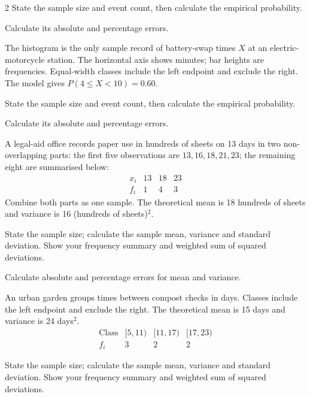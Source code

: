\begin{multicols}{2}
State the sample size and event count, then calculate the empirical probability. 

Calculate its absolute and percentage errors. 


The histogram is the only sample record of battery-swap times $X$ at an electric-motorcycle station. The horizontal axis shows minutes; bar heights are frequencies. Equal-width classes include the left endpoint and exclude the right.
The model gives $P(4\le X<10)=0.60$.

State the sample size and event count, then calculate the empirical probability. 

Calculate its absolute and percentage errors. 



A legal-aid office records paper use in hundreds of sheets on 13 days in two non-overlapping parts: the first five observations are $13,16,18,21,23$; the remaining eight are summarised below:
\[\begin{array}{c|rrr}x_i&13&18&23\\\hline f_i&1&4&3\end{array}\]
Combine both parts as one sample. The theoretical mean is 18 hundreds of sheets and variance is 16 (hundreds of sheets)$^2$.

State the sample size; calculate the sample mean, variance and standard deviation. Show your frequency summary and weighted sum of squared deviations. 

Calculate absolute and percentage errors for mean and variance. 




An urban garden groups times between compost checks in days. Classes include the left endpoint and exclude the right. The theoretical mean is 15 days and variance is 24 days$^2$.
\[\begin{array}{c|rrr}\text{Class}&[5,11)&[11,17)&[17,23)\\\hline f_i&3&2&2\end{array}\]

State the sample size; calculate the sample mean, variance and standard deviation. Show your frequency summary and weighted sum of squared deviations. 


\end{multicols}
